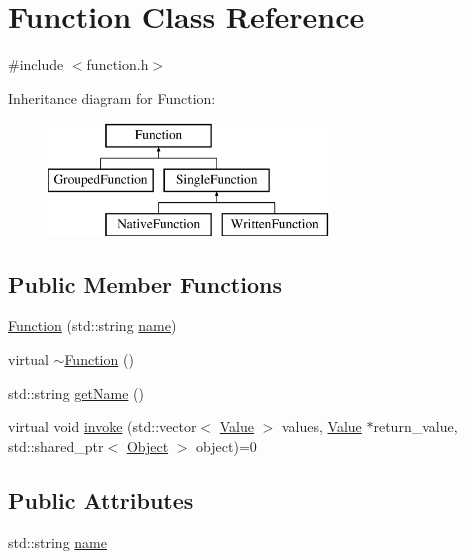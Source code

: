 \hypertarget{classFunction}{}\section{Function Class Reference}
\label{classFunction}


{\ttfamily \#include $<$function.\+h$>$}

Inheritance diagram for Function\+:\begin{figure}[H]
\begin{center}
\leavevmode
\includegraphics[height=3.000000cm]{classFunction}
\end{center}
\end{figure}
\subsection*{Public Member Functions}
\begin{DoxyCompactItemize}
\item 
\hyperlink{classFunction_aa339244413ee4f0e959a2f61dd874b43}{Function} (std\+::string \hyperlink{classFunction_a161d1ceb4f67f3222caf429fea7b71f1}{name})
\item 
virtual \hyperlink{classFunction_a8697b2e490a4314a7ccbb17aea8ce537}{$\sim$\+Function} ()
\item 
std\+::string \hyperlink{classFunction_a5b7d859d767e8a9c19fc5b81a0d10395}{get\+Name} ()
\item 
virtual void \hyperlink{classFunction_a84f9a63e68becc27e58ea738ba4cd698}{invoke} (std\+::vector$<$ \hyperlink{classValue}{Value} $>$ values, \hyperlink{classValue}{Value} $\ast$return\+\_\+value, std\+::shared\+\_\+ptr$<$ \hyperlink{classObject}{Object} $>$ object)=0
\end{DoxyCompactItemize}
\subsection*{Public Attributes}
\begin{DoxyCompactItemize}
\item 
std\+::string \hyperlink{classFunction_a161d1ceb4f67f3222caf429fea7b71f1}{name}
\end{DoxyCompactItemize}


